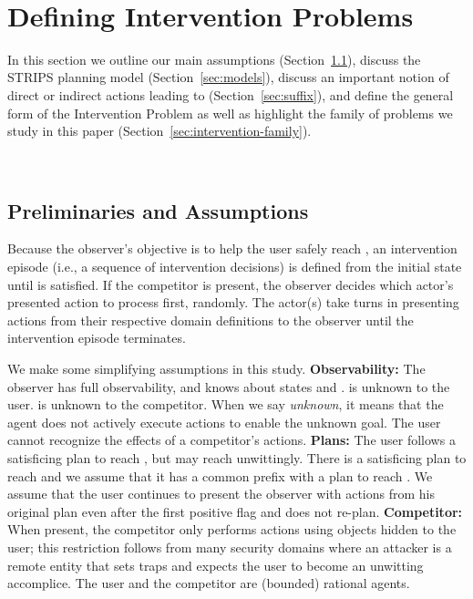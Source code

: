 ~\section{Defining Intervention Problems}
\label{sec:intervention-problem}
In this section we outline our main assumptions (Section~\ref{sec:unsafe-suffix-prelim}), discuss the STRIPS planning model (Section~\ref{sec:models}), discuss an important notion of direct or indirect actions leading to \undesired (Section~\ref{sec:suffix}), and define the general form of the Intervention Problem as well as highlight the family of problems we study in this paper (Section~\ref{sec:intervention-family}).

~\subsection{Preliminaries and Assumptions}
\label{sec:unsafe-suffix-prelim}
Because the observer's objective is to help the user safely reach \desired, an intervention episode (i.e., a sequence of intervention decisions) is defined from the initial state \initialState until \desired is satisfied.
If the competitor is present, the observer decides which actor's presented action to process first, randomly. 
The actor(s) take turns in presenting actions from their respective domain definitions to the observer until the intervention episode terminates.

We make some simplifying assumptions in this study.
\textbf{Observability:} 
The observer has full observability, and knows about states \desired and \undesired.
\undesired is unknown to the user. \desired is unknown to the competitor.
When we say \textit{unknown}, it means that the agent does not actively execute actions to enable the unknown goal.
The user cannot recognize the effects of a competitor's actions. 
\textbf{Plans:} 
The user follows a satisficing plan to reach \desired, but may reach \undesired unwittingly. 
There is a satisficing plan to reach \dandu and we assume that it has a common prefix with a plan to reach \desired. We assume that the user continues to present the observer with actions from his original plan even after the first positive flag and does not re-plan. 
\textbf{Competitor:}
When present, the competitor only performs actions using objects hidden to the user; this restriction follows from many security domains where an attacker is a remote entity that sets traps and expects the user to become an unwitting accomplice.
The user and the competitor are (bounded) rational agents.

